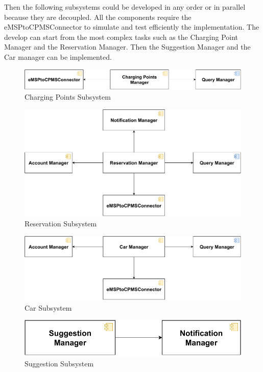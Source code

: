 Then the following subsystems could be developed in any order or in parallel because they are decoupled. All the components require
the eMSPtoCPMSConnector to simulate and test efficiently the implementation. 
The develop can start from the most complex tasks such as the Charging Point Manager and the Reservation Manager. 
Then the Suggestion Manager and the Car manager can be implemented.
\begin{figure}[H]
    \centering
    \includegraphics[scale=0.6]{src/Integration/eMSP_CP.pdf}
    \caption{Charging Points Subsystem}
\end{figure}
\begin{figure}[H]
    \centering
    \includegraphics[scale=0.6]{src/Integration/eMSP_Reservation.pdf}
    \caption{Reservation Subsystem}
\end{figure}
\begin{figure}[H]
    \centering
    \includegraphics[scale=0.6]{src/Integration/eMSP_Car.pdf}
    \caption{Car Subsystem}
\end{figure}
\begin{figure}[H]
    \centering
    \includegraphics[scale=0.6]{src/Integration/eMSP_Suggestion.pdf}
    \caption{Suggestion Subsystem}
\end{figure}
